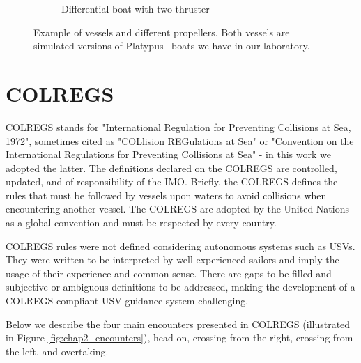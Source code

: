 \begin{figure}[H]
\begin{subfigure}[b]{0.52\textwidth}
            \caption{Differential boat with two thruster}
            \label{fig:chap2_diffboat}
        \end{subfigure}
    
    \caption{Example of vessels and different propellers. Both vessels are simulated versions of Platypus~\cite{PlatypusLLC} boats we have in our laboratory.}
    \label{fig:boats}
    \end{figure}

\section{COLREGS}
\label{sec:colregs}

    \ac{COLREGS}\cite{COLREGS} stands for "International Regulation for Preventing Collisions at Sea, 1972", sometimes cited as "COLlision REGulations at Sea" or "Convention on the International Regulations for Preventing Collisions at Sea" - in this work we adopted the latter. The definitions declared on the \ac{COLREGS} are controlled, updated, and of responsibility of the \ac{IMO}. Briefly, the \ac{COLREGS} defines the rules that must be followed by vessels upon waters to avoid collisions when encountering another vessel. 
    The \ac{COLREGS} are adopted by the United Nations as a global convention and must be respected by every country.
    
    \ac{COLREGS} rules were not defined considering autonomous systems such as \ac{USV}s. They were written to be interpreted by well-experienced sailors and imply the usage of their experience and common sense. There are gaps to be filled and subjective or ambiguous definitions to be addressed, making the development of a \ac{COLREGS}-compliant \ac{USV} guidance system challenging.

    Below we describe the four main encounters presented in \ac{COLREGS} (illustrated in Figure \ref{fig:chap2_encounters}), head-on, crossing from the right, crossing from the left, and overtaking.
    
